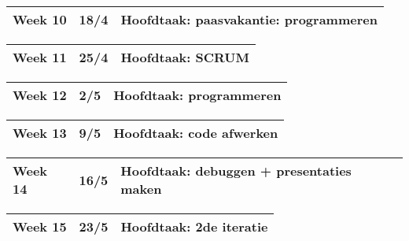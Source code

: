 \documentclass{article}
\begin{document}
\begin{center}
\begin{tabular}[t]{|p{1.3cm}|p{0.8cm}|p{9cm}|}
\hline
Week 10 & 18/4 &	\textbf{Hoofdtaak:} paasvakantie: programmeren \\
\hline
\end{tabular}
\end{center}

\begin{center}
\begin{tabular}[t]{|p{1.3cm}|p{0.8cm}|p{9cm}|}
\hline
Week 11 & 25/4 &	\textbf{Hoofdtaak:} SCRUM \\
\hline
\end{tabular}
\end{center}

\begin{center}
\begin{tabular}[t]{|p{1.3cm}|p{0.8cm}|p{9cm}|}
\hline
Week 12 & 2/5  &	\textbf{Hoofdtaak:} programmeren\\
\hline
\end{tabular}
\end{center}

\begin{center}
\begin{tabular}[t]{|p{1.3cm}|p{0.8cm}|p{9cm}|}
\hline
Week 13 &	9/5 &	\textbf{Hoofdtaak:} code afwerken \\
\hline
\end{tabular}
\end{center}

\begin{center}
\begin{tabular}[t]{|p{1.3cm}|p{0.8cm}|p{9cm}|}
\hline
Week 14 &	16/5 &	\textbf{Hoofdtaak:} debuggen + presentaties maken \\
\hline
\end{tabular}
\end{center}

\begin{center}
\begin{tabular}[t]{|p{1.3cm}|p{0.8cm}|p{9cm}|}
\hline
Week 15 &	23/5 &	\textbf{Hoofdtaak:} 2de iteratie  \\
\hline
\end{tabular}
\end{center}

\end{document}
